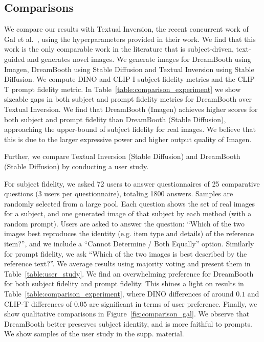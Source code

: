 \subsection{Comparisons}

We compare our results with Textual Inversion, the recent concurrent work of Gal et al.~\cite{gal2022image}, using the hyperparameters provided in their work. We find that this work is the only comparable work in the literature that is subject-driven, text-guided and generates novel images. We generate images for DreamBooth using Imagen, DreamBooth using Stable Diffusion and Textual Inversion using Stable Diffusion. We compute DINO and CLIP-I subject fidelity metrics and the CLIP-T prompt fidelity metric. In Table~\ref{table:comparison_experiment} we show sizeable gaps in both subject and prompt fidelity metrics for DreamBooth over Textual Inversion. We find that DreamBooth (Imagen) achieves higher scores for both subject and prompt fidelity than DreamBooth (Stable Diffusion), approaching the upper-bound of subject fidelity for real images. We believe that this is due to the larger expressive power and higher output quality of Imagen.

Further, we compare Textual Inversion (Stable Diffusion) and DreamBooth (Stable Diffusion) by conducting a user study. 

For subject fidelity, we asked 72 users to answer questionnaires of 25 comparative questions (3 users per questionnaire), totaling 1800 answers. Samples are randomly selected from a large pool. Each question shows the set of real images for a subject, and one generated image of that subject by each method (with a random prompt). Users are asked to answer the question: ``Which of the two images best reproduces the identity (e.g. item type and details) of the reference item?'', and we include a ``Cannot Determine / Both Equally'' option. Similarly for prompt fidelity, we ask ``Which of the two images is best described by the reference text?''. We average results using majority voting and present them in Table~\ref{table:user_study}. We find an overwhelming preference for DreamBooth for both subject fidelity and prompt fidelity. This shines a light on results in Table~\ref{table:comparison_experiment}, where DINO differences of around $0.1$ and CLIP-T differences of $0.05$ are significant in terms of user preference. Finally, we show qualitative comparisons in Figure~\ref{fig:comparison_gal}. We observe that DreamBooth better preserves subject identity, and is more faithful to prompts. We show samples of the user study in the supp. material.

